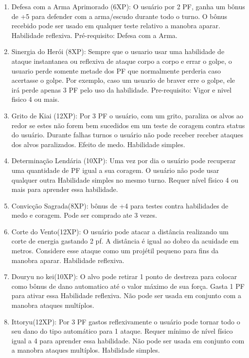 \begin{enumerate}
	\item Defesa com a Arma Aprimorado (6XP): O usuário por 2 PF, ganha um bônus de +5 para defender com a arma/escudo durante todo o turno. O bônus recebido pode ser usado em qualquer teste relativo a manobra aparar. Habilidade reflexiva. Pré-requisito: Defesa com a Arma.
	
	\item Sinergia do Herói (8XP): Sempre que o usuario usar uma habilidade de ataque instantanea ou reflexiva de ataque corpo a corpo e errar o golpe, o usuario perde somente metade dos PF que normalmente perderia caso acertasse o golpe. Por exemplo, caso um usuario de braver erre o golpe, ele irá perde apenas 3 PF pelo uso da habilidade. Pre-requisito: Vigor e nivel fisico 4 ou mais.

	\item Grito de Kiai (12XP): Por 3 PF o usuário, com um grito, paraliza os alvos ao redor se estes não forem bem sucedidos em um teste de coragem contra status do usuário. Durante falhas turnos o usuário não pode receber receber ataques dos alvos paralizados. Efeito de medo. Habilidade simples.

	\item Determinação Lendária (10XP): Uma vez por dia o usuário pode recuperar uma quantidade de PF igual a sua coragem. O usuário não pode usar qualquer outra Habilidade simples no mesmo turno. Requer nível físico 4 ou mais para aprender essa habilidade. 

	\item Convicção Sagrada(8XP): bônus de +4 para testes contra habilidades de medo e coragem. Pode ser comprado ate 3 vezes.

	\item Corte do Vento(12XP): O usuário pode atacar a distância realizando um corte de energia gastando 2 pf. A distância é igual ao dobro da acuidade em metros. Considere esse ataque como um projétil pequeno para fins da manobra aparar. Habilidade reflexiva.
        
\item Douryu no kei(10XP): O alvo pode retirar 1 ponto de destreza para colocar como bônus de dano automatico até o valor máximo de sua força. Gasta 1 PF para ativar essa Habilidade reflexiva. Não pode ser usada em conjunto com a manobra ataques multíplos.

	\item Ittoryu(12XP): Por 3 PF gastos reflexivamente o usuário pode tornar todo o seu dano do tipo automático para 1 ataque. Requer mínimo de nível físico igual a 4 para aprender essa habilidade. Não pode ser usada em conjunto com a manobra ataques multíplos. Habilidade simples.
	

\end{enumerate}
